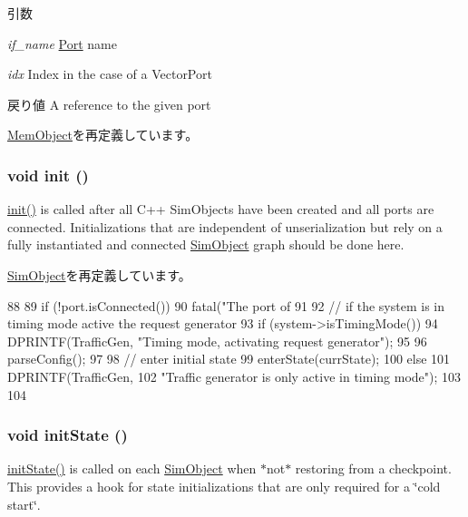\begin{DoxyParams}{引数}
\item[{\em if\_\-name}]\hyperlink{classPort}{Port} name \item[{\em idx}]Index in the case of a VectorPort\end{DoxyParams}
\begin{DoxyReturn}{戻り値}
A reference to the given port 
\end{DoxyReturn}


\hyperlink{classMemObject_adc4e675e51defbdd1e354dac729d0703}{MemObject}を再定義しています。\hypertarget{classTrafficGen_a02fd73d861ef2e4aabb38c0c9ff82947}{
\subsubsection[{init}]{\setlength{\rightskip}{0pt plus 5cm}void init ()}}
\label{classTrafficGen_a02fd73d861ef2e4aabb38c0c9ff82947}
\hyperlink{classTrafficGen_a02fd73d861ef2e4aabb38c0c9ff82947}{init()} is called after all C++ SimObjects have been created and all ports are connected. Initializations that are independent of unserialization but rely on a fully instantiated and connected \hyperlink{classSimObject}{SimObject} graph should be done here. 

\hyperlink{classSimObject_a02fd73d861ef2e4aabb38c0c9ff82947}{SimObject}を再定義しています。


\begin{DoxyCode}
88 {
89     if (!port.isConnected())
90         fatal("The port of %
91 
92     // if the system is in timing mode active the request generator
93     if (system->isTimingMode()) {
94         DPRINTF(TrafficGen, "Timing mode, activating request generator\n");
95 
96         parseConfig();
97 
98         // enter initial state
99         enterState(currState);
100     } else {
101         DPRINTF(TrafficGen,
102                 "Traffic generator is only active in timing mode\n");
103     }
104 }
\end{DoxyCode}
\hypertarget{classTrafficGen_a3c34ea9b29f410748d4435a667484924}{
\subsubsection[{initState}]{\setlength{\rightskip}{0pt plus 5cm}void initState ()}}
\label{classTrafficGen_a3c34ea9b29f410748d4435a667484924}
\hyperlink{classTrafficGen_a3c34ea9b29f410748d4435a667484924}{initState()} is called on each \hyperlink{classSimObject}{SimObject} when $\ast$not$\ast$ restoring from a checkpoint. This provides a hook for state initializations that are only required for a \char`\"{}cold start\char`\"{}. 

